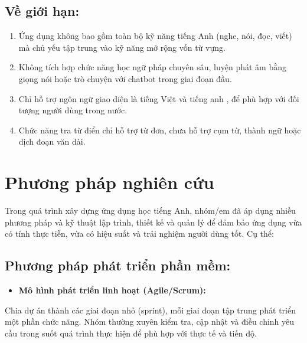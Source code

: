     \subsection{ Về giới hạn:} 
    \begin{enumerate}
    \item \textbf{}Ứng dụng không bao gồm toàn bộ kỹ năng tiếng Anh (nghe, nói, đọc, viết) mà chủ yếu tập trung vào kỹ năng mở rộng vốn từ vựng.
    \item \textbf{} Không tích hợp chức năng học ngữ pháp chuyên sâu, luyện phát âm bằng giọng nói hoặc trò chuyện với chatbot trong giai đoạn đầu.
    \item \textbf{}Chỉ hỗ trợ ngôn ngữ giao diện là tiếng Việt và tiếng anh , để phù hợp với đối tượng người dùng trong nước.
    \item \textbf{}Chức năng tra từ điển chỉ hỗ trợ từ đơn, chưa hỗ trợ cụm từ, thành ngữ hoặc dịch đoạn văn dài.
\end{enumerate}

\section{Phương pháp nghiên cứu}
Trong quá trình xây dựng ứng dụng học tiếng Anh, nhóm/em đã áp dụng nhiều phương pháp và kỹ thuật lập trình, thiết kế và quản lý để đảm bảo ứng dụng vừa có tính thực tiễn, vừa có hiệu suất và trải nghiệm người dùng tốt. Cụ thể:
 
\subsection{Phương pháp phát triển phần mềm:}
\begin{enumerate}
    \begin{itemize}
    \item \textbf{Mô hình phát triển linh hoạt (Agile/Scrum):}
\end{itemize}
\end{enumerate}
Chia dự án thành các giai đoạn nhỏ (sprint), mỗi giai đoạn tập trung phát triển một phần chức năng. Nhóm thường xuyên kiểm tra, cập nhật và điều chỉnh yêu cầu trong suốt quá trình thực hiện để phù hợp với thực tế và tiến độ.
    
